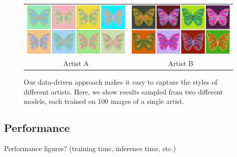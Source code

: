 \begin{figure}[ht]
\begin{tabular}{cc} 
\includegraphics[width=.475\linewidth]{figs/styleSugar}&\includegraphics[width=.475\linewidth]{figs/styleAlbenaj}\\
Artist A&Artist B\\
\end{tabular}

\caption{Our data-driven approach makes it easy to capture the styles of different artists. Here, we show results sampled from two different models, each trained on 100 images of a single artist.}
\vspace{-1.0em}
\end{figure}

\subsection{Performance}

Performance figures? (training time, inference time, etc.)